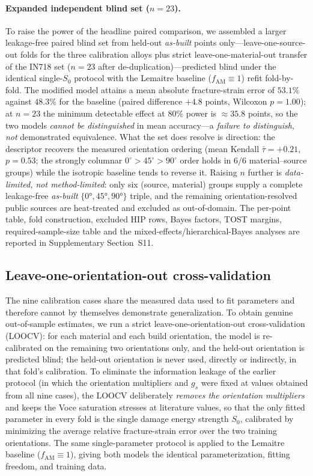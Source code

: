 \paragraph{Expanded independent blind set ($n = 23$).} To raise the power of the headline paired comparison, we assembled a larger leakage-free paired blind set from held-out \emph{as-built} points only---leave-one-source-out folds for the three calibration alloys plus strict leave-one-material-out transfer of the IN718 set ($n = 23$ after de-duplication)---predicted blind under the identical single-$S_0$ protocol with the Lemaitre baseline ($f_{\mathrm{AM}} \equiv 1$) refit fold-by-fold. The modified model attains a mean absolute fracture-strain error of $53.1\%$ against $48.3\%$ for the baseline (paired difference $+4.8$ points, Wilcoxon $p = 1.00$); at $n = 23$ the minimum detectable effect at $80\%$ power is $\approx 35.8$ points, so the two models \emph{cannot be distinguished} in mean accuracy---a \emph{failure to distinguish}, \emph{not} demonstrated equivalence. What the set does resolve is direction: the descriptor recovers the measured orientation ordering (mean Kendall $\bar\tau = +0.21$, $p = 0.53$; the strongly columnar $0^\circ\!>\!45^\circ\!>\!90^\circ$ order holds in $6/6$ material--source groups) while the isotropic baseline tends to reverse it. Raising $n$ further is \emph{data-limited, not method-limited}: only six (source, material) groups supply a complete leakage-free \emph{as-built} $\{\ang{0},\ang{45},\ang{90}\}$ triple, and the remaining orientation-resolved public sources are heat-treated and excluded as out-of-domain. The per-point table, fold construction, excluded HIP rows, Bayes factors, TOST margins, required-sample-size table and the mixed-effects/hierarchical-Bayes analyses are reported in Supplementary Section~S11.

\subsection{Leave-one-orientation-out cross-validation}
\label{sec:loocv}

The nine calibration cases share the measured data used to fit parameters and therefore cannot by themselves demonstrate generalization. To obtain genuine out-of-sample estimates, we run a strict leave-one-orientation-out cross-validation (LOOCV): for each material and each build orientation, the model is re-calibrated on the remaining two orientations only, and the held-out orientation is predicted blind; the held-out orientation is never used, directly or indirectly, in that fold's calibration. To eliminate the information leakage of the earlier protocol (in which the orientation multipliers and $g_s$ were fixed at values obtained from all nine cases), the LOOCV deliberately \emph{removes the orientation multipliers} and keeps the Voce saturation stresses at literature values, so that the only fitted parameter in every fold is the single damage energy strength $S_0$, calibrated by minimizing the average relative fracture-strain error over the two training orientations. The same single-parameter protocol is applied to the Lemaitre baseline ($f_{\mathrm{AM}} \equiv 1$), giving both models the identical parameterization, fitting freedom, and training data.

